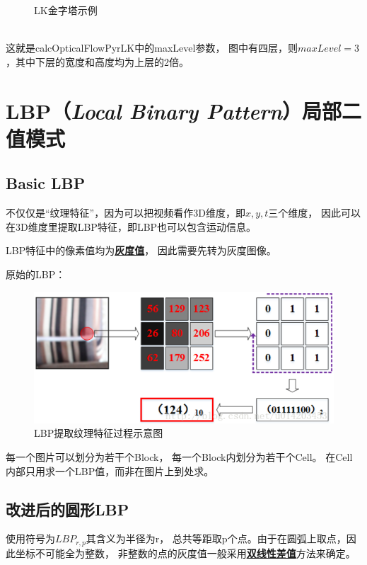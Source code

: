 \documentclass[AutoFakeBold]{MyFormat}
\begin{document}
\begin{enumerate}
\begin{figure}[!h]
        \caption{LK金字塔示例}
    \end{figure}
    \\这就是calcOpticalFlowPyrLK中的maxLevel参数，
    图中有四层，则$maxLevel=3$，其中下层的宽度和高度均为上层的2倍。
\end{enumerate}


\section{LBP（\textit{Local Binary Pattern}）局部二值模式}

\subsection{Basic LBP}
\par 不仅仅是“纹理特征”，因为可以把视频看作3D维度，即$x, y, t$三个维度，
因此可以在3D维度里提取LBP特征，即LBP也可以包含运动信息。
\par LBP特征中的像素值均为\textbf{\Large \underline{灰度值}}，
因此需要先转为灰度图像。
\par 原始的LBP：
\begin{figure}[!h]
    \centering
    \includegraphics[width=0.6\linewidth]{figures/2022.05.24/pic9.png}
    \caption{LBP提取纹理特征过程示意图}
\end{figure}
\par 每一个图片可以划分为若干个Block，
每一个Block内划分为若干个Cell。
在Cell内部只用求一个LBP值，而非在图片上到处求。

\subsection{改进后的圆形LBP}
\par 使用符号为$LBP_{r, p}$其含义为半径为r，
总共等距取p个点。由于在圆弧上取点，因此坐标不可能全为整数，
非整数的点的灰度值一般采用\textbf{\Large \underline{双线性差值}}方法来确定。
\end{document}

